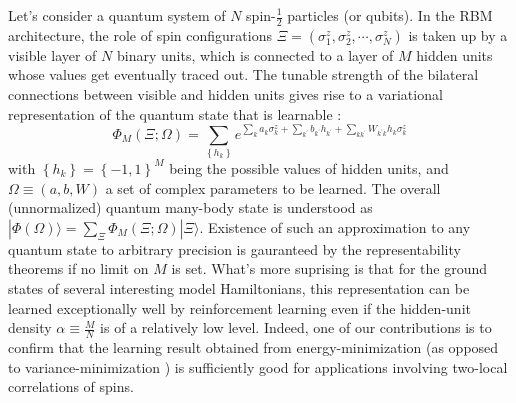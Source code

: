 \documentclass[aps,prl,reprint,superscriptaddress]{revtex4-2}
\begin{document}
Let's consider a quantum system of $ N $ spin-$ \frac{1}{2} $ particles (or qubits). In the RBM architecture, the role of spin configurations $ \Xi = \left( \sigma_{1}^z, \sigma_{2}^z, \cdots, \sigma_{N}^z \right) $ is taken up by a visible layer of $ N $ binary units, which is connected to a layer of $ M $ hidden units whose values get eventually traced out. The tunable strength of the bilateral connections between visible and hidden units gives rise to a variational representation of the quantum state that is learnable \cite{Carleo2017Solving}:
\begin{equation}
	\Phi_{M}(\Xi; \Omega) = \sum_{\left\{ h_{k} \right\}} e^{\sum_{k} a_{k} \sigma_{k}^{z} + \sum_{k^{\prime}} b_{k^{\prime}} h_{k^{\prime}} + \sum_{k k^{\prime}} W_{k^{\prime} k} h_{k} \sigma_{k}^{z}} \label{eq:RBM}
\end{equation}
with $ \left\{ h_{k} \right\} = \left\{ -1, 1 \right\}^M $ being the possible values of hidden units, and $ \Omega \equiv (a, b, W) $ a set of complex parameters to be learned. The overall (unnormalized) quantum many-body state is understood as $ | \Phi(\Omega) \rangle = \sum_{\Xi} \Phi_{M}(\Xi; \Omega) | \Xi \rangle $. Existence of such an approximation to any quantum state to arbitrary precision is gauranteed by the representability theorems \cite{Kolmogorov1963Representation,Hornik1991Approximation,LeRoux2008Representational} if no limit on $ M $ is set. What's more suprising is that for the ground states of several interesting model Hamiltonians, this representation can be learned exceptionally well by reinforcement learning even if the hidden-unit density $ \alpha \equiv \frac{M}{N} $ is of a relatively low level. Indeed, one of our contributions is to confirm that the learning result obtained from energy-minimization (as opposed to variance-minimization \cite{Kent1999MC-energy-variance}) is sufficiently good for applications involving two-local correlations of spins.
\end{document}
